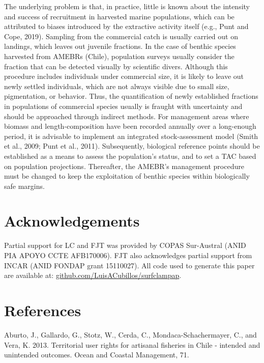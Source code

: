 \documentclass[12pt]{article}
\begin{document}
The underlying problem is that, in practice, little is known about the
intensity and success of recruitment in harvested marine populations,
which can be attributed to biases introduced by the extractive activity
itself (e.g., Punt and Cope, 2019). Sampling from the commercial catch
is usually carried out on landings, which leaves out juvenile fractions.
In the case of benthic species harvested from AMEBRs (Chile), population
surveys usually consider the fraction that can be detected visually by
scientific divers. Although this procedure includes individuals under
commercial size, it is likely to leave out newly settled individuals,
which are not always visible due to small size, pigmentation, or
behavior. Thus, the quantification of newly established fractions in
populations of commercial species usually is fraught with uncertainty
and should be approached through indirect methods. For management areas
where biomass and length-composition have been recorded annually over a
long-enough period, it is advisable to implement an integrated
stock-assessment model (Smith et al., 2009; Punt et al., 2011).
Subsequently, biological reference points should be established as a
means to assess the population's status, and to set a TAC based on
population projections. Thereafter, the AMEBR's management procedure
must be changed to keep the exploitation of benthic species within
biologically safe margins.

\hypertarget{acknowledgements}{%
\section{Acknowledgements}\label{acknowledgements}}

Partial support for LC and FJT was provided by COPAS Sur-Austral (ANID
PIA APOYO CCTE AFB170006). FJT also acknowledges partial support from
INCAR (ANID FONDAP grant 15110027). All code used to generate this paper
are available at:
\href{https://github.com/LuisACubillos/surfclampap}{github.com/LuisACubillos/surfclampap}.

\FloatBarrier

\hypertarget{references}{%
\section{References}\label{references}}

Aburto, J., Gallardo, G., Stotz, W., Cerda, C., Mondaca-Schachermayer,
C., and Vera, K. 2013. Territorial user rights for artisanal fisheries
in Chile - intended and unintended outcomes. Ocean and Coastal
Management, 71.
\end{document}
